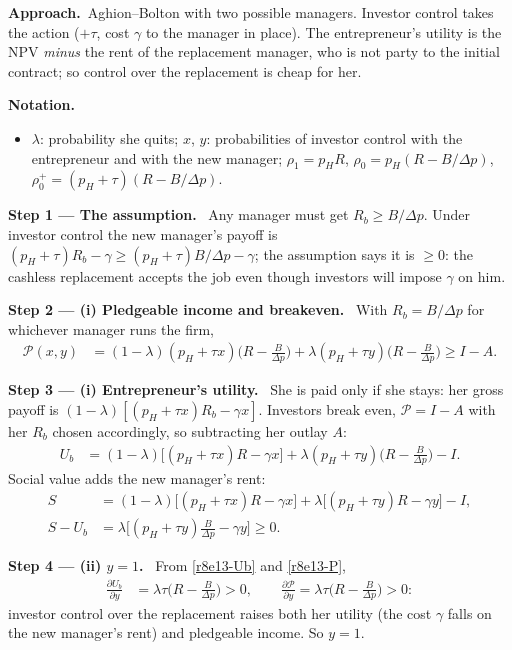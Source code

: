 \documentclass[11pt,a4paper]{article}
\newcommand{\notation}{\par\noindent\textbf{Notation.}}
\newcommand{\step}[2]{\par\medskip\noindent\textbf{Step #1 --- #2.}~}
\newcommand{\approach}{\par\smallskip\noindent\textbf{Approach.}~}
\newcommand{\dpp}{\Delta p}
\begin{document}
\approach Aghion--Bolton with two possible managers. Investor control takes the action ($+\tau$, cost $\gamma$ to the manager in place). The entrepreneur's utility is the NPV \emph{minus} the rent of the replacement manager, who is not party to the initial contract; so control over the replacement is cheap for her.

\notation
\begin{itemize}
  \item $\lambda$: probability she quits; $x$, $y$: probabilities of investor control with the entrepreneur and with the new manager; $\rho_1=p_HR$, $\rho_0=p_H(R-B/\dpp)$, $\rho_0^+=(p_H+\tau)(R-B/\dpp)$.
\end{itemize}

\step{1}{The assumption} Any manager must get $R_b\ge B/\dpp$. Under investor control the new manager's payoff is $(p_H+\tau)R_b-\gamma\ge(p_H+\tau)B/\dpp-\gamma$; the assumption says it is $\ge0$: the cashless replacement accepts the job even though investors will impose $\gamma$ on him.

\step{2}{(i) Pledgeable income and breakeven} With $R_b=B/\dpp$ for whichever manager runs the firm,
\begin{align}
  \mathcal P(x,y) &= (1-\lambda)(p_H+\tau x)\Big(R-\frac{B}{\dpp}\Big)+\lambda(p_H+\tau y)\Big(R-\frac{B}{\dpp}\Big)\ge I-A. \label{r8e13-P}
\end{align}

\step{3}{(i) Entrepreneur's utility} She is paid only if she stays: her gross payoff is $(1-\lambda)[(p_H+\tau x)R_b-\gamma x]$. Investors break even, $\mathcal P=I-A$ with her $R_b$ chosen accordingly, so subtracting her outlay $A$:
\begin{align}
  U_b &= (1-\lambda)\big[(p_H+\tau x)R-\gamma x\big]+\lambda(p_H+\tau y)\Big(R-\frac{B}{\dpp}\Big)-I. \label{r8e13-Ub}
\end{align}
Social value adds the new manager's rent:
\begin{align}
  S &= (1-\lambda)\big[(p_H+\tau x)R-\gamma x\big]+\lambda\big[(p_H+\tau y)R-\gamma y\big]-I, \nonumber\\
  S-U_b &= \lambda\Big[(p_H+\tau y)\frac{B}{\dpp}-\gamma y\Big]\ge0. \label{r8e13-gap}
\end{align}

\step{4}{(ii) $y=1$} From \eqref{r8e13-Ub} and \eqref{r8e13-P},
\begin{align}
  \frac{\partial U_b}{\partial y} &= \lambda\tau\Big(R-\frac{B}{\dpp}\Big)>0,\qquad \frac{\partial\mathcal P}{\partial y}=\lambda\tau\Big(R-\frac{B}{\dpp}\Big)>0: \nonumber
\end{align}
investor control over the replacement raises both her utility (the cost $\gamma$ falls on the new manager's rent) and pledgeable income. So $y=1$.
\end{document}
